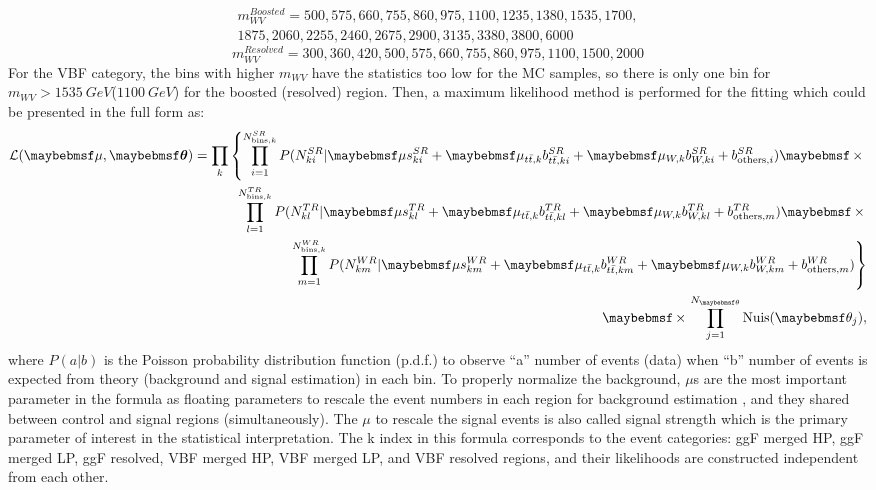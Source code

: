 \begin{multline}
m^{Boosted}_{WV}= 500, 575, 660, 755, 860, 975, 1100, 1235, 1380, 1535, 1700,\\ 1875, 2060, 2255, 2460, 2675, 2900, 3135, 3380, 3800, 6000
\end{multline}
\noindent
\begin{equation}
m^{Resolved}_{WV}= 300, 360, 420, 500, 575, 660, 755, 860, 975, 1100, 1500, 2000
\end{equation}
\noindent
For the VBF category, the bins with higher $m_{WV}$ have the statistics too low for the MC samples, so there is only one bin  for  $m_{WV}>1535~GeV$($1100~GeV$) for the boosted (resolved) region. Then, a maximum likelihood method is performed for the fitting which could be presented in the full form as:
 \begin{eqnarray}
 \label{Eq. ML_all}
 \mathcal{L}(\mu, \mbox{\boldmath $\theta$}) = \displaystyle\prod_{k} \left\{
 \displaystyle\prod_{i=1}^{N_{{\rm bins},k}^{SR}}P(N_{ki}^{SR}|\mu s_{ki}^{SR} + \mu_{t\bar{t},k} b_{t\bar{t},ki}^{SR} + \mu_{W,k} b_{W,ki}^{SR} + b_{{\rm others},i}^{SR})
 \times \right. \nonumber \\
 \displaystyle\prod_{l=1}^{N_{{\rm bins},k}^{TR}}P(N_{kl}^{TR}|\mu s_{kl}^{TR} + \mu_{t\bar{t},k} b_{t\bar{t},kl}^{TR} + \mu_{W,k} b_{W,kl}^{TR} + b_{{\rm others},m}^{TR})
 \times \nonumber \\
 \left. \displaystyle\prod_{m=1}^{N_{{\rm bins},k}^{WR}}P(N_{km}^{WR}|\mu s_{km}^{WR} + \mu_{t\bar{t},k} b_{t\bar{t},km}^{WR} + \mu_{W,k} b_{W,km}^{WR} + b_{{\rm others},m}^{WR})
 \right\} \nonumber \\
 \times\displaystyle\prod_{j=1}^{N_{\theta}}{\rm Nuis}(\theta_j),
 \label{Eq:likelihood}
 \end{eqnarray}
where $P(a|b)$ is the Poisson probability distribution function (p.d.f.) to observe ``a'' number of events (data) when ``b'' number of events is expected from theory (background and signal estimation) in each bin. To properly normalize the background, $\mu$s are the most important parameter in the formula as floating parameters to rescale the event numbers in each region for background estimation , and they shared between control and signal regions (simultaneously). The $\mu$ to rescale the signal events is also called signal strength which is the primary parameter of interest in the statistical interpretation. The k index in this formula corresponds to the event categories: ggF merged HP, ggF merged LP, ggF resolved, VBF merged HP, VBF merged LP, and VBF resolved regions, and their likelihoods are constructed independent from each other.
